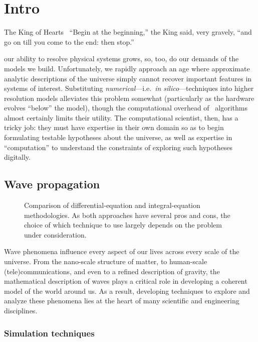 \chapter{\label{ch:intro}Intro}

\begin{frontquote}{The King of Hearts~\cite{wonderland}}
``Begin at the beginning,'' the King said, very gravely, ``and go on till you come to the end: then stop.''
\end{frontquote}

 our ability to resolve physical systems grows, so, too, do our demands of the models we build.
Unfortunately, we rapidly approach an age where approximate analytic descriptions of the universe simply cannot recover important features in systems of interest.
Substituting \emph{numerical}---i.e.\ \emph{in silico}---techniques into higher resolution models alleviates this problem somewhat (particularly as the hardware evolves ``below'' the model), though the computational overhead of \naive\ algorithms almost certainly limits their utility.
The computational scientist, then, has a tricky job: they must have expertise in their own domain so as to begin formulating testable hypotheses about the universe, as well as expertise in ``computation'' to understand the constraints of exploring such hypotheses digitally.

\section{Wave propagation}

\begin{figure}
  \centering
  
  \caption{\label{fig:mindmap} Comparison of differential-equation and integral-equation methodologies.
    As both approaches have several pros and cons, the choice of which technique to use largely depends on the problem under consideration.
  }
\end{figure}

Wave phenomena influence every aspect of our lives across every scale of the universe.
From the nano-scale structure of matter, to human-scale (tele)communications, and even to a refined description of gravity, the mathematical description of waves plays a critical role in developing a coherent model of the world around us.
As a result, developing techniques to explore and analyze these phenomena lies at the heart of many scientific and engineering disciplines.

\subsection{Simulation techniques}

